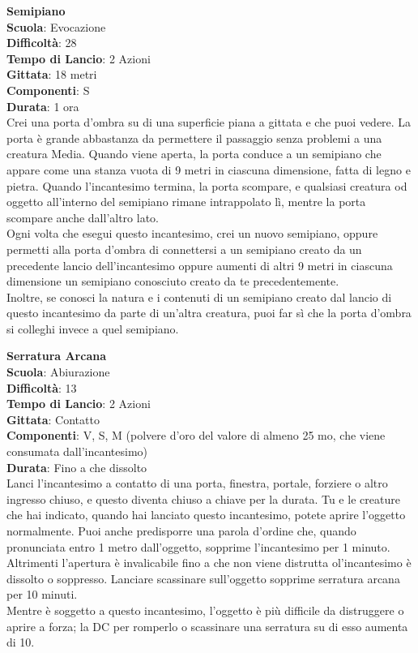 \begin{multicols}{2}
\medskip\textbf{Semipiano}\\
\textbf{Scuola}: Evocazione\\
\textbf{Difficoltà}: 28\\
\textbf{Tempo di Lancio}: 2 Azioni\\
\textbf{Gittata}: 18 metri\\
\textbf{Componenti}: S\\
\textbf{Durata}: 1 ora\\
Crei una porta d'ombra su di una superficie piana a gittata e che puoi vedere. La porta è grande abbastanza da permettere il passaggio senza problemi a una creatura Media. Quando viene aperta, la porta conduce a un semipiano che appare come una stanza vuota di 9 metri in ciascuna dimensione, fatta di legno e pietra. Quando l'incantesimo termina, la porta scompare, e qualsiasi creatura od oggetto all'interno del semipiano rimane intrappolato lì, mentre la porta scompare anche dall'altro lato.\\
Ogni volta che esegui questo incantesimo, crei un nuovo semipiano, oppure permetti alla porta d'ombra di connettersi a un semipiano creato da un precedente lancio dell'incantesimo oppure aumenti di altri 9 metri in ciascuna dimensione un semipiano conosciuto creato da te precedentemente. \\
Inoltre, se conosci la natura e i contenuti di un semipiano creato dal lancio di questo incantesimo da parte di un'altra creatura, puoi far sì che la porta d'ombra si colleghi invece a quel semipiano.

\medskip\textbf{Serratura Arcana}\\
\textbf{Scuola}: Abiurazione\\
\textbf{Difficoltà}: 13\\
\textbf{Tempo di Lancio}: 2 Azioni\\
\textbf{Gittata}: Contatto\\
\textbf{Componenti}: V, S, M (polvere d'oro del valore di almeno 25 mo, che viene consumata dall'incantesimo) \\
\textbf{Durata}: Fino a che dissolto\\
Lanci l'incantesimo a contatto di una porta, finestra, portale, forziere o altro ingresso chiuso, e questo diventa chiuso a chiave per la durata. Tu e le creature che hai indicato, quando hai lanciato questo incantesimo, potete aprire l'oggetto normalmente. Puoi anche predisporre una parola d'ordine che, quando pronunciata entro 1 metro dall'oggetto, sopprime l'incantesimo per 1 minuto. Altrimenti l'apertura è invalicabile fino a che non viene distrutta ol'incantesimo è dissolto o soppresso. Lanciare scassinare sull'oggetto sopprime serratura arcana per 10 minuti.\\
Mentre è soggetto a questo incantesimo, l'oggetto è più difficile da distruggere o aprire a forza; la DC per romperlo o scassinare una serratura su di esso aumenta di 10.


\end{multicols}
